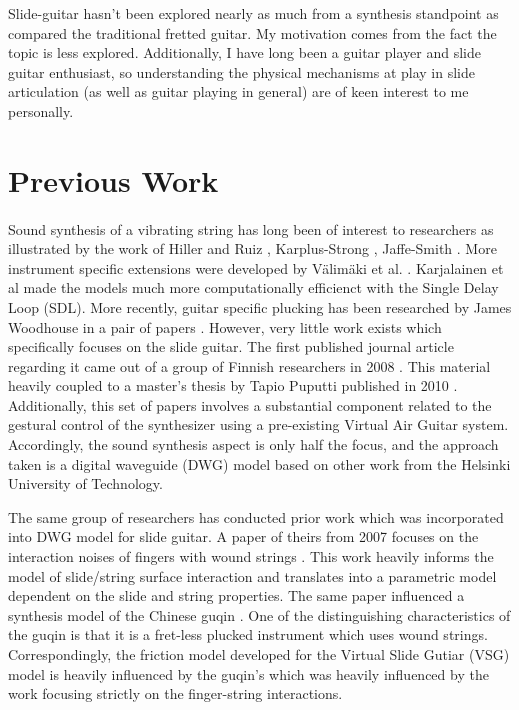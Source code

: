 \documentclass[12pt]{article}
\begin{document}
Slide-guitar hasn’t been explored nearly as much from a synthesis standpoint as compared the traditional fretted guitar. My motivation comes from the fact the topic is less explored. Additionally, I have long been a guitar player and slide guitar enthusiast, so understanding the physical mechanisms at play in slide articulation (as well as guitar playing in general) are of keen interest to me personally.

\section*{Previous Work}
\paragraph{}
Sound synthesis of a vibrating string has long been of interest to researchers as illustrated by the work of Hiller and Ruiz \cite{hiller_synthesizing_1971} \cite{hiller_synthesizing_1971-1}, Karplus-Strong \cite{karplus_digital_1983}, Jaffe-Smith \cite{jaffe_extensions_1983}. More instrument specific extensions were developed by Välimäki et al. \cite{vaelimaeki_physical_1996-1}.  Karjalainen et al made the models much more computationally efficienct with the Single Delay Loop (SDL)\cite{karjalainen_plucked-string_1998}. More recently, guitar specific plucking has been researched by James Woodhouse in a pair of papers \cite{woodhouse_synthesis_2004} \cite{woodhouse_plucked_2004}. However, very little work exists which specifically focuses on the slide guitar. The first published journal article regarding it came out of a group of Finnish researchers in 2008 \cite{pakarinen_virtual_2008}. This material heavily coupled to a master’s thesis by Tapio Puputti published in 2010 \cite{puputti_real-time_2012}. Additionally, this set of papers involves a substantial component related to the gestural control of the synthesizer using a pre-existing Virtual Air Guitar system. Accordingly, the sound synthesis aspect is only half the focus, and the approach taken is a digital waveguide (DWG) model based on other work from the Helsinki University of Technology.

The same group of researchers has conducted prior work which was incorporated into DWG model for slide guitar. A paper of theirs from 2007 focuses on the interaction noises of fingers with wound strings \cite{pakarinen_analysis_2007}. This work heavily informs the model of slide/string surface interaction and translates into a parametric model dependent on the slide and string properties. The same paper influenced a synthesis model of the Chinese guqin \cite{penttinen_model-based_2006}. One of the distinguishing characteristics of the guqin is that it is a fret-less plucked instrument which uses wound strings. Correspondingly, the friction model developed for the Virtual Slide Gutiar (VSG) model is heavily influenced by the guqin’s which was heavily influenced by the work focusing strictly on the finger-string interactions.
\end{document}
